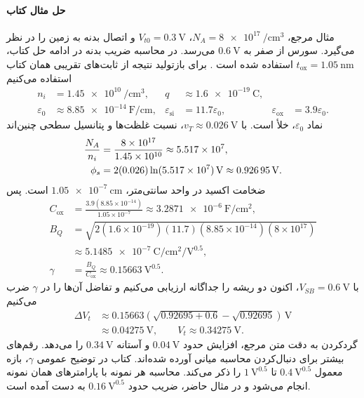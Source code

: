 \paragraph*{حل مثال  کتاب}
مثال مرجع، \(N_A=\qty{8e17}{\per\centi\metre\cubed}\)،
\(V_{t0}=\qty{0.3}{\volt}\) و اتصال بدنه به زمین را در نظر می‌گیرد.
سورس از صفر به \(\qty{0.6}{\volt}\) می‌رسد. در محاسبه ضریب بدنه در
ادامه حل کتاب، \(t_{\mathrm{ox}}=\qty{1.05}{\nano\metre}\) استفاده
شده است \cite[مثال  و رابطه ، صفحات ۷۹ و ۸۰]{weste}.
برای بازتولید نتیجه از ثابت‌های تقریبی همان کتاب استفاده می‌کنیم
\begin{align*}
 n_i&=\qty{1.45e10}{\per\centi\metre\cubed},
 &q&\approx\qty{1.6e-19}{\coulomb},\\
 \varepsilon_0&\approx\qty{8.85e-14}{\farad\per\centi\metre},
 &\varepsilon_{\mathrm{si}}&=11.7\varepsilon_0,
 &\varepsilon_{\mathrm{ox}}&=3.9\varepsilon_0.
\end{align*}
نماد \(\varepsilon_0\)،  خلأ است. با
\(v_T\approx\qty{0.026}{\volt}\)، نسبت غلظت‌ها و پتانسیل سطحی چنین‌اند
\begin{align}
 \frac{N_A}{n_i}&=\frac{8\times10^{17}}{1.45\times10^{10}}
 \approx5.517\times10^7,\notag\\
 \phi_s&=2(0.026)\ln(5.517\times10^7)\,\unit{\volt}
 \approx\qty{0.92695}{\volt}.
 \label{eq:body-book-example-phi}
\end{align}
ضخامت اکسید در واحد سانتی‌متر،
\(\qty{1.05e-7}{\centi\metre}\) است. پس
\begin{align*}
 C_{\mathrm{ox}}&=\frac{3.9(8.85\times10^{-14})}{1.05\times10^{-7}}
 \approx\qty{3.2871e-6}{\farad\per\centi\metre\squared},\\
 B_Q&=\sqrt{2(1.6\times10^{-19})(11.7)(8.85\times10^{-14})(8\times10^{17})}
 \\
 &\approx\qty{5.1485e-7}{\coulomb\per\centi\metre\squared\per\volt\tothe{0.5}},\\
 \gamma&=\frac{B_Q}{C_{\mathrm{ox}}}
 \approx\qty{0.15663}{\volt\tothe{0.5}}.
\end{align*}
با \(V_{SB}=\qty{0.6}{\volt}\)، اکنون دو ریشه را جداگانه ارزیابی
می‌کنیم و تفاضل آن‌ها را در \(\gamma\) ضرب می‌کنیم
\begin{align*}
 \Delta V_t&\approx0.15663\left(\sqrt{0.92695+0.6}-\sqrt{0.92695}\right)
 \,\unit{\volt}\\
 &\approx\qty{0.04275}{\volt},\qquad
 V_t\approx\qty{0.34275}{\volt}.
\end{align*}
گردکردن به دقت متن مرجع، افزایش حدود \(\qty{0.04}{\volt}\) و آستانه
\(\qty{0.34}{\volt}\) را می‌دهد. رقم‌های بیشتر برای دنبال‌کردن محاسبه
میانی آورده شده‌اند. کتاب در توضیح عمومی \(\gamma\)، بازه معمول
\(\qty{0.4}{\volt\tothe{0.5}}\) تا
\(\qty{1}{\volt\tothe{0.5}}\) را ذکر می‌کند. محاسبه هر نمونه با
پارامترهای همان نمونه انجام می‌شود و در مثال حاضر، ضریب حدود
\(\qty{0.16}{\volt\tothe{0.5}}\) به دست آمده است.

